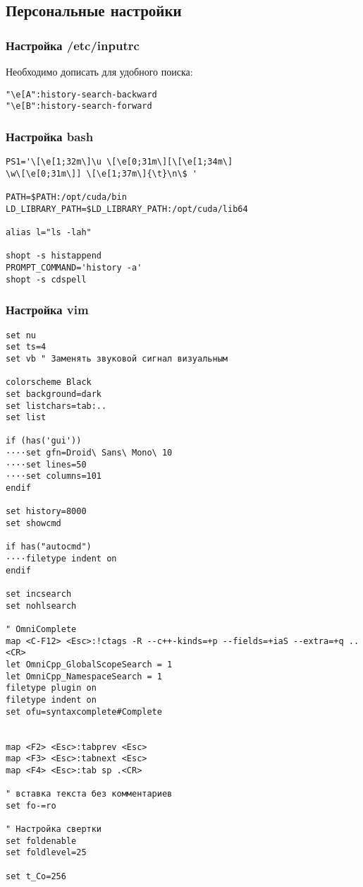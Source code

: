 \documentclass[12pt, a4paper]{article}
\begin{document}
\subsection{Персональные настройки}

\subsubsection{Настройка /etc/inputrc}

Необходимо дописать для удобного поиска:

\begin{verbatim}
"\e[A":history-search-backward
"\e[B":history-search-forward
\end{verbatim}


\subsubsection{Настройка bash}
\begin{verbatim}
PS1='\[\e[1;32m\]\u \[\e[0;31m\][\[\e[1;34m\]
\w\[\e[0;31m\]] \[\e[1;37m\]{\t}\n\$ '

PATH=$PATH:/opt/cuda/bin
LD_LIBRARY_PATH=$LD_LIBRARY_PATH:/opt/cuda/lib64

alias l="ls -lah"

shopt -s histappend
PROMPT_COMMAND='history -a'
shopt -s cdspell
\end{verbatim}

\subsubsection{Настройка vim}
\begin{verbatim}
set nu 
set ts=4
set vb " Заменять звуковой сигнал визуальным

colorscheme Black
set background=dark
set listchars=tab:..
set list

if (has('gui'))
····set gfn=Droid\ Sans\ Mono\ 10 
····set lines=50
····set columns=101
endif

set history=8000
set showcmd

if has("autocmd")
····filetype indent on 
endif

set incsearch
set nohlsearch

" OmniComplete
map <C-F12> <Esc>:!ctags -R --c++-kinds=+p --fields=+iaS --extra=+q ..<CR>
let OmniCpp_GlobalScopeSearch = 1
let OmniCpp_NamespaceSearch = 1
filetype plugin on 
filetype indent on 
set ofu=syntaxcomplete#Complete


map <F2> <Esc>:tabprev <Esc>
map <F3> <Esc>:tabnext <Esc>
map <F4> <Esc>:tab sp .<CR>

" вставка текста без комментариев
set fo-=ro

" Настройка свертки
set foldenable
set foldlevel=25

set t_Co=256
\end{verbatim}
\end{document}
